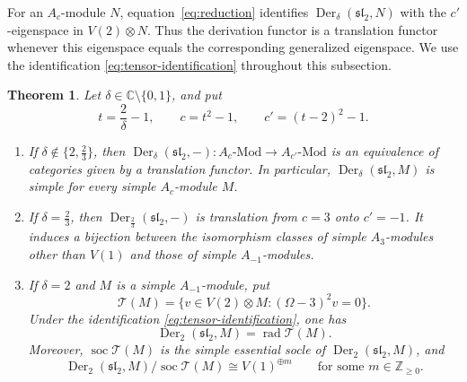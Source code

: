 \documentclass[11pt,reqno]{amsart}
\numberwithin{equation}{section}
\newcommand{\C}{\mathbb C}
\newcommand{\Z}{\mathbb Z}
\newcommand{\s}{\mathfrak{sl}_2}
\newcommand{\T}{\mathcal T}
\DeclareMathOperator{\Der}{Der}
\DeclareMathOperator{\soc}{soc}
\DeclareMathOperator{\rad}{rad}
\newtheorem{theorem}{Theorem}[section]
\theoremstyle{definition}
\theoremstyle{remark}
\begin{document}
For an \(A_c\)-module \(N\), equation~\eqref{eq:reduction}
identifies \(\Der_\delta(\s,N)\) with the \(c'\)-eigenspace
in \(V(2)\otimes N\). Thus the derivation functor is a translation
functor whenever this eigenspace equals the corresponding generalized
eigenspace. We use the identification \eqref{eq:tensor-identification}
throughout this subsection.

\begin{theorem}\label{thm:translation}
Let \(\delta\in\C\setminus\{0,1\}\), and put
\[
t=\frac{2}{\delta}-1,\qquad c=t^2-1,\qquad c'=(t-2)^2-1.
\]
\begin{enumerate}
\item If \(\delta\notin\{2,\frac{2}{3}\}\), then
\(\Der_\delta(\s,-):A_c\text{-}\mathrm{Mod}
\to A_{c'}\text{-}\mathrm{Mod}\)
is an equivalence of categories given by a translation functor.
In particular, \(\Der_\delta(\s,M)\) is simple for every simple
\(A_c\)-module \(M\).
\item If \(\delta=\frac{2}{3}\), then \(\Der_{\frac{2}{3}}(\s,-)\) is translation
from \(c=3\) onto \(c'=-1\). It induces a bijection between
the isomorphism classes of simple \(A_3\)-modules other than
\(V(1)\) and those of simple \(A_{-1}\)-modules.
\item If \(\delta=2\) and \(M\) is a simple \(A_{-1}\)-module,
put
\begin{equation}\label{eq:out}
\T(M)=\{v\in V(2)\otimes M:(\Omega-3)^2v=0\}.
\end{equation}
Under the identification \eqref{eq:tensor-identification}, one has
\begin{equation}\label{eq:radical}
\Der_2(\s,M)=\rad\T(M).
\end{equation}
Moreover, \(\soc\T(M)\) is the simple essential socle of
\(\Der_2(\s,M)\), and
\[
\Der_2(\s,M)/\soc\T(M)\cong V(1)^{\oplus m}
\qquad\text{for some }m\in\Z_{\ge0}.
\]
\end{enumerate}
\end{theorem}
\end{document}
